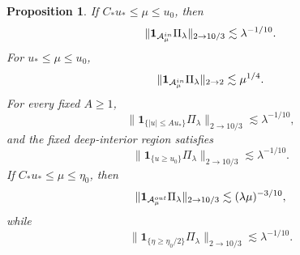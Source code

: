 \documentclass[10pt,a4paper]{amsart}
\newtheorem{proposition}[theorem]{Proposition}
\numberwithin{equation}{section}
\newcommand{\one}{\mathbf 1}
\newcommand{\norm}[1]{\lVert #1\rVert}
\begin{document}
\begin{proposition}
If \(C_*u_*\le\mu\le u_0\), then
\begin{equation}\label{eq:package-allowed}
 \norm{\one_{\mathcal A_\mu^{\rm in}}\Pi_\lambda}_{2\to10/3}
 \lesssim\lambda^{-1/10}.
\end{equation}
For \(u_*\le\mu\le u_0\),
\begin{equation}\label{eq:package-inner-L2}
 \norm{\one_{\mathcal A_\mu^{\rm in}}\Pi_\lambda}_{2\to2}
 \lesssim\mu^{1/4}.
\end{equation}
For every fixed \(A\ge1\),
\begin{equation}\label{eq:package-core}
 \norm{\one_{\{|u|\le Au_*\}}\Pi_\lambda}_{2\to10/3}
 \lesssim\lambda^{-1/10},
\end{equation}
and the fixed deep-interior region satisfies
\begin{equation}\label{eq:package-deep}
 \norm{\one_{\{u\ge u_0\}}\Pi_\lambda}_{2\to10/3}
 \lesssim\lambda^{-1/10}.
\end{equation}
If \(C_*u_*\le\mu\le\eta_0\), then
\begin{equation}\label{eq:package-outer}
 \norm{\one_{\mathcal A_\mu^{\rm out}}\Pi_\lambda}_{2\to10/3}
 \lesssim(\lambda\mu)^{-3/10},
\end{equation}
while
\begin{equation}\label{eq:package-far-outer}
 \norm{\one_{\{\eta\ge\eta_0/2\}}\Pi_\lambda}_{2\to10/3}
 \lesssim\lambda^{-1/10}.
\end{equation}
\end{proposition}
\end{document}
